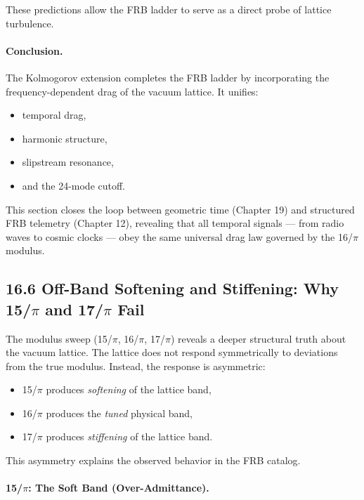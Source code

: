 \documentclass[11pt, letterpaper, openany]{book}
\begin{document}
These predictions allow the FRB ladder to serve as a direct probe of lattice turbulence.

\paragraph{Conclusion.}

The Kolmogorov extension completes the FRB ladder by incorporating the frequency-dependent 
drag of the vacuum lattice.  
It unifies:

\begin{itemize}
    \item temporal drag,
    \item harmonic structure,
    \item slipstream resonance,
    \item and the 24-mode cutoff.
\end{itemize}

This section closes the loop between geometric time (Chapter 19) and structured FRB telemetry 
(Chapter 12), revealing that all temporal signals --- from radio waves to cosmic clocks --- obey 
the same universal drag law governed by the 16/$\pi$ modulus.

\subsection*{16.6 Off-Band Softening and Stiffening: Why 15/$\pi$ and 17/$\pi$ Fail}

The modulus sweep (15/$\pi$, 16/$\pi$, 17/$\pi$) reveals a deeper structural truth about the
vacuum lattice. The lattice does not respond symmetrically to deviations from the true modulus.
Instead, the response is asymmetric:

\begin{itemize}
    \item 15/$\pi$ produces \emph{softening} of the lattice band,
    \item 16/$\pi$ produces the \emph{tuned} physical band,
    \item 17/$\pi$ produces \emph{stiffening} of the lattice band.
\end{itemize}

This asymmetry explains the observed behavior in the FRB catalog.

\paragraph{15/$\pi$: The Soft Band (Over-Admittance).}
\end{document}
